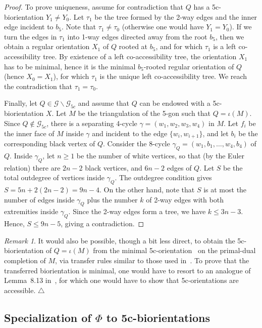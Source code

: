 \documentclass[letter]{amsart}
\numberwithin{theo}{section}
\theoremstyle{remark}
\newtheorem{remark}[theo]{Remark}
\def\cG{\mathcal{G}}
\def\cGfc{\cG_{5c}}
\begin{document}
\begin{proof}
To prove uniqueness, assume for contradiction that $Q$ has a 5c-biorientation $Y_1\neq Y_0$. 
Let $\tau_1$ be the tree formed by the 2-way edges and the inner edge incident to $b_5$. Note that $\tau_1\neq\tau_0$ (otherwise one would have $Y_1=Y_0$). If we turn the edges in $\tau_1$ into 1-way edges directed away from the root $b_5$, then we obtain a regular orientation $X_1$ of $Q$ rooted at $b_5$, and for which $\tau_1$ is a left co-accessibility tree. By existence of a left co-accessibility tree, the orientation $X_1$ has to be minimal, hence it is the minimal $b_5$-rooted regular orientation of $Q$ (hence $X_0=X_1$), for which $\tau_1$ is the unique left co-accessibility tree. We reach the contradiction that $\tau_1=\tau_0$. 

Finally, let $Q\in\cG\backslash\cGfc$ and assume that $Q$ can be endowed with a 5c-biorientation $X$. Let $M$ be the triangulation of the 5-gon such that $Q=\iota(M)$.  
Since $Q\notin\cGfc$, there is a separating 4-cycle $\gamma=(w_1,w_2,w_3,w_4)$ in $M$. Let $f_i$ be the inner face of $M$ inside $\gamma$ and incident to the edge $\{w_i,w_{i+1}\}$, and let $b_i$ be the corresponding black vertex of $Q$. 
Consider the 8-cycle $\gamma_Q=(w_1,b_1,\ldots,w_4,b_4)$ of $Q$. Inside $\gamma_Q$, let $n\geq 1$ be the number of white vertices, so that (by the Euler relation) there are $2n-2$ black vertices, and $6n-2$ edges of $Q$. 
Let $S$ be the total outdegree of vertices inside $\gamma_Q$. The outdegree condition gives $S=5n+2(2n-2)=9n-4$. On the other hand, note that $S$ is at most the number of edges inside $\gamma_Q$ plus the number $k$ of 2-way edges with both extremities inside $\gamma_Q$. Since the 2-way edges form a tree, we have $k\leq 3n-3$. Hence, $S\leq 9n-5$, giving a  contradiction.     
\end{proof}

\begin{remark}\label{rk:transf}
It would also be possible, though a bit less direct, to obtain the 5c-biorientation of $Q=\iota(M)$ from the minimal 5c-orientation~\cite{BernardiFL23} on the primal-dual completion of $M$, via transfer rules similar to those used in~\cite{FuPoScL}. To prove that the transferred biorientation is minimal, one would have to resort to an analogue of Lemma~8.13 in~\cite{FuPoScL}, for which one would have to show that 5c-orientations are accessible. \hfill$\triangle$
\end{remark}

\subsection{Specialization of $\Phi$ to 5c-biorientations}\label{sec:special}
\end{document}
